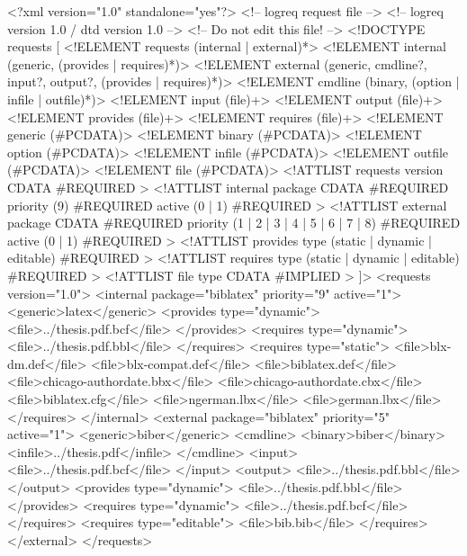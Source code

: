 <?xml version="1.0" standalone="yes"?>
<!-- logreq request file -->
<!-- logreq version 1.0 / dtd version 1.0 -->
<!-- Do not edit this file! -->
<!DOCTYPE requests [
  <!ELEMENT requests (internal | external)*>
  <!ELEMENT internal (generic, (provides | requires)*)>
  <!ELEMENT external (generic, cmdline?, input?, output?, (provides | requires)*)>
  <!ELEMENT cmdline (binary, (option | infile | outfile)*)>
  <!ELEMENT input (file)+>
  <!ELEMENT output (file)+>
  <!ELEMENT provides (file)+>
  <!ELEMENT requires (file)+>
  <!ELEMENT generic (#PCDATA)>
  <!ELEMENT binary (#PCDATA)>
  <!ELEMENT option (#PCDATA)>
  <!ELEMENT infile (#PCDATA)>
  <!ELEMENT outfile (#PCDATA)>
  <!ELEMENT file (#PCDATA)>
  <!ATTLIST requests
    version CDATA #REQUIRED
  >
  <!ATTLIST internal
    package CDATA #REQUIRED
    priority (9) #REQUIRED
    active (0 | 1) #REQUIRED
  >
  <!ATTLIST external
    package CDATA #REQUIRED
    priority (1 | 2 | 3 | 4 | 5 | 6 | 7 | 8) #REQUIRED
    active (0 | 1) #REQUIRED
  >
  <!ATTLIST provides
    type (static | dynamic | editable) #REQUIRED
  >
  <!ATTLIST requires
    type (static | dynamic | editable) #REQUIRED
  >
  <!ATTLIST file
    type CDATA #IMPLIED
  >
]>
<requests version="1.0">
  <internal package="biblatex" priority="9" active="1">
    <generic>latex</generic>
    <provides type="dynamic">
      <file>../thesis.pdf.bcf</file>
    </provides>
    <requires type="dynamic">
      <file>../thesis.pdf.bbl</file>
    </requires>
    <requires type="static">
      <file>blx-dm.def</file>
      <file>blx-compat.def</file>
      <file>biblatex.def</file>
      <file>chicago-authordate.bbx</file>
      <file>chicago-authordate.cbx</file>
      <file>biblatex.cfg</file>
      <file>ngerman.lbx</file>
      <file>german.lbx</file>
    </requires>
  </internal>
  <external package="biblatex" priority="5" active="1">
    <generic>biber</generic>
    <cmdline>
      <binary>biber</binary>
      <infile>../thesis.pdf</infile>
    </cmdline>
    <input>
      <file>../thesis.pdf.bcf</file>
    </input>
    <output>
      <file>../thesis.pdf.bbl</file>
    </output>
    <provides type="dynamic">
      <file>../thesis.pdf.bbl</file>
    </provides>
    <requires type="dynamic">
      <file>../thesis.pdf.bcf</file>
    </requires>
    <requires type="editable">
      <file>bib.bib</file>
    </requires>
  </external>
</requests>
